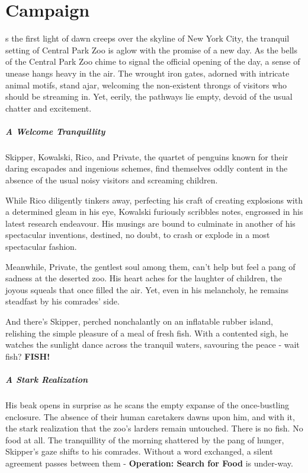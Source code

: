 \chapter{Campaign}
\entryfont \noindent {}s the first light of dawn creeps over the skyline of New York City, the tranquil setting of Central Park Zoo is aglow with the promise of a new day. As the bells of the Central Park Zoo chime to signal the official opening of the day, a sense of unease hangs heavy in the air. The wrought iron gates, adorned with intricate animal motifs, stand ajar, welcoming the non-existent throngs of visitors who should be streaming in. Yet, eerily, the pathways lie empty, devoid of the usual chatter and excitement.\\

\paragraph*{A Welcome Tranquillity}
Skipper, Kowalski, Rico, and Private, the quartet of penguins known for their daring escapades and ingenious schemes, find themselves oddly content in the absence of the usual noisy visitors and screaming children.

While Rico diligently tinkers away, perfecting his craft of creating explosions with a determined gleam in his eye, Kowalski furiously scribbles notes, engrossed in his latest research endeavour. His musings are bound to culminate in another of his spectacular inventions, destined, no doubt, to crash or explode in a most spectacular fashion.

Meanwhile, Private, the gentlest soul among them, can't help but feel a pang of sadness at the deserted zoo. His heart aches for the laughter of children, the joyous squeals that once filled the air. Yet, even in his melancholy, he remains steadfast by his comrades' side.

And there's Skipper, perched nonchalantly on an inflatable rubber island, relishing the simple pleasure of a meal of fresh fish. With a contented sigh, he watches the sunlight dance across the tranquil waters, savouring the peace - wait fish? \textbf{FISH!}\\

\paragraph*{A Stark Realization}
His beak opens in surprise as he scans the empty expanse of the once-bustling enclosure. The absence of their human caretakers dawns upon him, and with it, the stark realization that the zoo's larders remain untouched. There is no fish. No food at all. The tranquillity of the morning shattered by the pang of hunger, Skipper's gaze shifts to his comrades. Without a word exchanged, a silent agreement passes between them - \textbf{Operation: Search for Food} is under-way.\\

